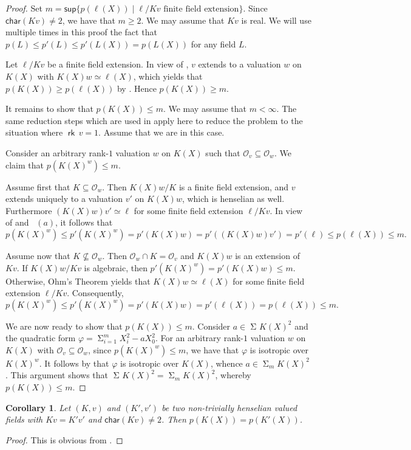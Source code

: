 \documentclass[12pt,leqno]{amsart}
\newcommand{\mc}[1]{\mathcal{#1}}
\DeclareMathOperator{\newsum}{\mathsf{\Sigma}}
\renewcommand{\sum}{\newsum}
\newcommand{\sos}[2]{\sum_{#1}\!{#2}^2}
\DeclareMathOperator{\rk}{\mathsf{rk}}
\renewcommand{\sup}{\mathsf{sup}}
\newcommand{\car}{\mathsf{char}}
\renewcommand{\leq}{\leqslant}
\renewcommand{\geq}{\geqslant}
\numberwithin{equation}{section}
\newtheorem{cor}[equation]{Corollary}
\theoremstyle{definition}
\theoremstyle{plain}
\begin{document}
\begin{proof}
Set $m=\sup \{p(\ell (X))\mid \ell/Kv\mbox{ finite field extension}\}$. 
Since $\car(Kv)\neq 2$, we have that $m\geq 2$.
We may assume that $Kv$ is real. 
We will use multiple times in this proof the fact that $p(L) \leq p'(L) \leq p'(L(X))=p(L(X))$ for any field $L$.
    
Let $\ell/Kv$ be a finite field extension.
In view of \cite[Theorem 3.5]{BGVG14}, $v$ extends to a valuation $w$ on $K(X)$ with $K(X)w\simeq \ell(X)$, which yields that $p(K(X))\geq p(\ell(X))$ by .
Hence $p(K(X))\geq m$.

It remains to show that $p(K(X))\leq m$. We may assume that $m<\infty$.
The same reduction steps which are used in  apply here to reduce the problem to the situation where $\rk\, v=1$.
Assume that we are in this case.
    
Consider an arbitrary rank-$1$ valuation $w$ on $K(X)$ such that $\mc{O}_v \subseteq \mc{O}_w$.
We claim that $p(K(X)^w) \leq m$.
    
Assume first that $K\subseteq \mc{O}_w$.
Then $K(X)w/K$ is a finite field extension, and $v$ extends uniquely to a valuation $v'$ on $K(X)w$, which is henselian as well.
Furthermore $(K(X)w)v'\simeq \ell$ for some finite field extension $\ell/Kv$.  
In view of  and ~$(a)$, it follows that \[p(K(X)^w)\leq p'(K(X)^w)= p'(K(X)w)=p'((K(X)w)v')=p'(\ell)\leq p(\ell(X))\leq m.\]
     
Assume now that $K\not\subseteq \mc{O}_w$. Then $\mc{O}_w\cap K=\mc{O}_v$ and $K(X)w$ is an extension of $Kv$. 
If $K(X)w/Kv$ is algebraic, then $p'(K(X)^w)=p'(K(X)w)\leq m$.
Otherwise, Ohm's Theorem \cite{Ohm83} yields that $K(X)w\simeq\ell(X)$ for some finite field extension $\ell/Kv$.
Consequently,
\[p(K(X)^w)\leq p'(K(X)^w)=p'(K(X)w)=p'(\ell(X))=p(\ell(X))\leq m.\] 

We are now ready to show that $p(K(X))\leq m$.
Consider $a \in \sos{}{K(X)}$ and the quadratic form $\varphi=\sum_{i=1}^m X_i^2-aX_0^2$.
For an arbitrary rank-$1$ valuation $w$ on $K(X)$ with $\mc{O}_v \subseteq \mc{O}_w$, since $p(K(X)^w) \leq m$, we have that $\varphi$ is isotropic over $K(X)^w$.
It follows by  that $\varphi$ is isotropic over $K(X)$, whence $a \in \sos{m}{K(X)}$.
This argument shows that $\sos{}{K(X)}=\sos{m}{K(X)}$, whereby $p(K(X))\leq m$.
\end{proof} 

\begin{cor}\label{pyth-rafufi-henselian}
Let $(K,v)$ and $(K',v')$ be two non-trivially henselian valued fields with $Kv= K'v'$ and $\car(Kv)\neq 2$. Then $p(K(X))=p(K'(X))$.
\end{cor}
\begin{proof}
This is obvious from .
\end{proof}
\end{document}

